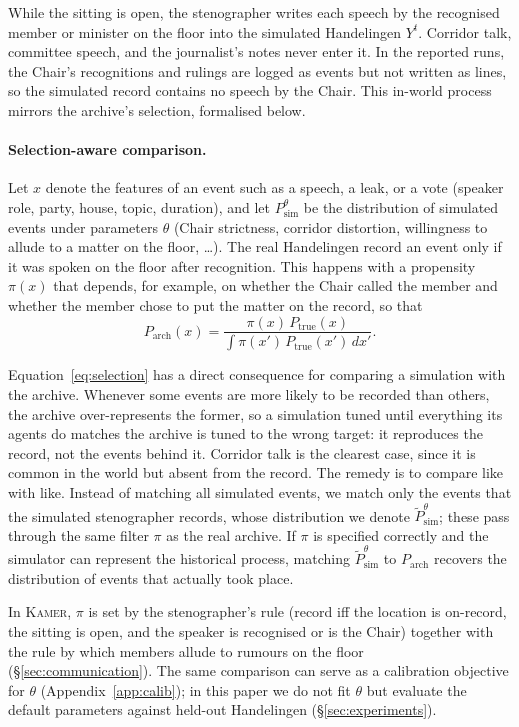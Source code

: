 \documentclass[sigconf,review,anonymous]{acmart}
\newcommand{\sys}{\textsc{Kamer}}
\begin{document}
While the sitting is open, the
stenographer writes each speech by the recognised member or minister on
the floor into the simulated Handelingen $Y^t$. Corridor talk, committee
speech, and the journalist's notes never enter it. In the reported runs,
the Chair's recognitions and rulings are logged as events but not written
as lines, so the simulated record contains no speech by the Chair. This
in-world process mirrors the archive's selection, formalised below.

\paragraph{Selection-aware comparison.} Let $x$ denote the features of an
event such as a speech, a leak, or a
vote (speaker role, party, house, topic, duration), and let
$P^\theta_{\text{sim}}$ be the distribution of simulated events under
parameters $\theta$ (Chair strictness, corridor distortion, willingness to
allude to a matter on the floor, \ldots). The real Handelingen record an
event only if it was spoken on the floor after recognition. This happens
with a propensity $\pi(x)$ that depends, for example, on whether the Chair
called the member and whether the member chose to put the matter on the
record, so that
\begin{equation}
P_{\text{arch}}(x)=\frac{\pi(x)\,P_{\text{true}}(x)}{\int \pi(x')\,P_{\text{true}}(x')\,dx'}.
\label{eq:selection}
\end{equation}

Equation~\eqref{eq:selection} has a direct consequence for comparing a
simulation with the archive.
Whenever some events are more likely to be recorded than others, the
archive over-represents the former, so a simulation tuned until everything
its agents do matches the archive is tuned to the wrong target: it
reproduces the record, not the events behind it. Corridor talk is the
clearest case, since it is common in the world but absent from the record.
The remedy is to compare like with like. Instead of matching all simulated
events, we match only the events that the simulated stenographer records,
whose distribution we denote $\tilde P^\theta_{\text{sim}}$; these pass
through the same filter $\pi$ as the real archive. If $\pi$ is specified
correctly and the simulator can represent the historical process, matching
$\tilde P^\theta_{\text{sim}}$ to $P_{\text{arch}}$ recovers the
distribution of events that actually took place.

In \sys{}, $\pi$ is set by the stenographer's rule (record iff the
location is on-record, the sitting is open, and the speaker is recognised
or is the Chair) together with the rule by which members allude to rumours
on the floor (\S\ref{sec:communication}). The same comparison can serve
as a calibration objective for $\theta$ (Appendix~\ref{app:calib}); in
this paper we do not fit $\theta$ but evaluate the default parameters
against held-out Handelingen (\S\ref{sec:experiments}).
\end{document}

